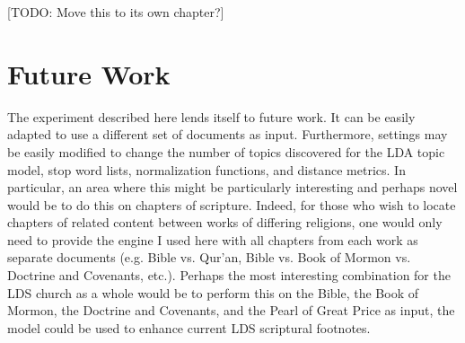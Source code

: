 [TODO: Move this to its own chapter?]

\section{Future Work}
The experiment described here lends itself to future work. It can be easily adapted to use a different set of documents as input. Furthermore, settings may be easily modified to change the number of topics discovered for the LDA topic model, stop word lists, normalization functions, and distance metrics. In particular, an area where this might be particularly interesting and perhaps novel would be to do this on chapters of scripture. Indeed, for those who wish to locate chapters of related content between works of differing religions, one would only need to provide the engine I used here with all chapters from each work as separate documents (e.g. Bible vs. Qur'an, Bible vs. Book of Mormon vs. Doctrine and Covenants, etc.). Perhaps the most interesting combination for the LDS church as a whole would be to perform this on the Bible, the Book of Mormon, the Doctrine and Covenants, and the Pearl of Great Price as input, the model could be used to enhance current LDS scriptural footnotes.
